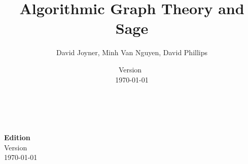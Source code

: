 \documentclass[a4paper,twoside,12pt]{book}
\begin{document}

\title{\Huge\bf Algorithmic Graph Theory and Sage}
\author{\Large David Joyner, Minh Van Nguyen, David Phillips}
\date{%
  Version~\documentEdition \\
  \today
}
\maketitle

{\thispagestyle{empty}
   \\\\
  \textbf{Edition} \\
  Version~\documentEdition \\
  \today
}

\frontmatter
\setcounter{tocdepth}{1}
\tableofcontents
\let\cleardoublepage\clearpage

\let\cleardoublepage\clearpage

\mainmatter













\appendix
\cleardoublepage

\cleardoublepage


\backmatter
\cleardoublepage
{}


\cleardoublepage
{}
\printindex
\end{document}
